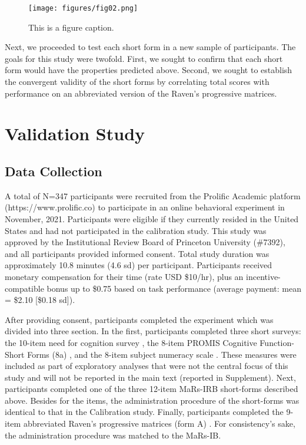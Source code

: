 \documentclass[a4paper,man,natbib]{apa6}
\begin{document}
\begin{figure}
\centering
\texttt{[image: figures/fig02.png]}
\caption{\label{fig:fig02}This is a figure caption.}
\end{figure}

Next, we proceeded to test each short form in a new sample of participants. The goals for this study were twofold. First, we sought to confirm that each short form would have the properties predicted above. Second, we sought to establish the convergent validity of the short forms by correlating total scores with performance on an abbreviated version of the Raven's progressive matrices.

\section{Validation Study}

\subsection{Data Collection}

A total of N=347 participants were recruited from the Prolific Academic platform (https://www.prolific.co) to participate in an online behavioral experiment in November, 2021. Participants were eligible if they currently resided in the United States and had not participated in the calibration study. This study was approved by the Institutional Review Board of Princeton University (\#7392), and all participants provided informed consent. Total study duration was approximately 10.8 minutes (4.6 sd) per participant. Participants received monetary compensation for their time (rate USD \$10/hr), plus an incentive-compatible bonus up to \$0.75 based on task performance (average payment: mean = \$2.10 [\$0.18 sd]). 

After providing consent, participants completed the experiment which was divided into three section. In the first, participants completed three short surveys: the 10-item need for cognition survey \citep{chiesi2018applying}, the 8-item PROMIS Cognitive Function-Short Forms (8a) \citep{iverson2021normative}, and the 8-item subject numeracy scale \citep{fagerlin2007measuring}. These measures were included as part of exploratory analyses that were not the central focus of this study and will not be reported in the main text (reported in Supplement). Next, participants completed one of the three 12-item MaRs-IRB short-forms described above. Besides for the items, the administration procedure of the short-forms was identical to that in the Calibration study. Finally, participants completed the 9-item abbreviated Raven's progressive matrices (form A) \citep{bilker2012development}. For consistency's sake, the administration procedure was matched to the MaRs-IB. 
\end{document}
